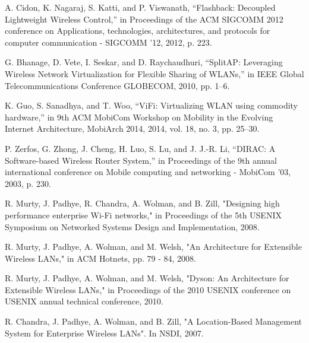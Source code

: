 \begin{thebibliography}{1}
 A. Cidon, K. Nagaraj, S. Katti, and P. Viswanath, “Flashback: Decoupled Lightweight Wireless Control,” in Proceedings of the ACM SIGCOMM 2012 conference on Applications, technologies, architectures, and protocols for computer communication - SIGCOMM ’12, 2012, p. 223.

 G. Bhanage, D. Vete, I. Seskar, and D. Raychaudhuri, “SplitAP: Leveraging Wireless Network Virtualization for Flexible Sharing of WLANs,” in IEEE Global Telecommunications Conference GLOBECOM, 2010, pp. 1–6.

 K. Guo, S. Sanadhya, and T. Woo, “ViFi: Virtualizing WLAN using commodity hardware,” in 9th ACM MobiCom Workshop on Mobility in the Evolving Internet Architecture, MobiArch 2014, 2014, vol. 18, no. 3, pp. 25–30.


 P. Zerfos, G. Zhong, J. Cheng, H. Luo, S. Lu, and J. J.-R. Li, “DIRAC: A Software-based Wireless Router System,” in Proceedings of the 9th annual international conference on Mobile computing and networking - MobiCom ’03, 2003, p. 230.

 R. Murty, J. Padhye, R. Chandra, A. Wolman, and B. Zill, "Designing high performance enterprise Wi-Fi networks," in Proceedings of the 5th USENIX Symposium on Networked Systems Design and Implementation, 2008.

 R. Murty, J. Padhye, A. Wolman, and M. Welsh, "An Architecture for Extensible Wireless LANs," in ACM Hotnets, pp. 79 - 84, 2008.

 R. Murty, J. Padhye, A. Wolman, and M. Welsh, "Dyson: An Architecture for Extensible Wireless LANs," in Proceedings of the 2010 USENIX conference on USENIX annual technical conference, 2010.


 R. Chandra, J. Padhye, A. Wolman, and B. Zill, "A Location-Based Management System for Enterprise Wireless LANs". In NSDI, 2007.


\end{thebibliography}
